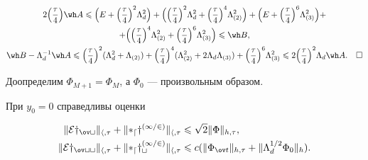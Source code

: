 \begin{gather*}


2\Big(\frac{\tau}{4}\Big)\wh A \lee \Big(E+\Big(\frac{\tau}{4}\Big)^2


\Lambda_d^2\Big)+\Big(\Big(\frac{\tau}{4}\Big)^2\Lambda_d^2+


\Big(\frac{\tau}{4}\Big)^4\Lambda_{(2)}^2\Big)+\Big(E+


\Big(\frac{\tau}{4}\Big)^6\Lambda_{(3)}^2\Big)+\\


%


+\Big(\Big(\frac{\tau}{4}\Big)^4\Lambda_{(2)}^2+


\Big(\frac{\tau}{4}\Big)^6\Lambda_{(3)}^2\Big)\lee\wh B ,\\


%


\wh B -\Lambda_d^{-1}\wh A \lee\Big(\frac{\tau}{4}\Big)^2


(\Lambda_d^2+\Lambda_{(2)})+\Big(\frac{\tau}{4}\Big)^4(\Lambda_{(2)}^2+


2\Lambda_d\Lambda_{(3)})+\Big(\frac{\tau}{4}\Big)^6\Lambda_{(3)}^2\lee


2\Big(\frac{\tau}{4}\Big)^2\Lambda_d\wh A.\quad\square


\end{gather*}





Доопределим $\Phi_{M+1}=\Phi_M$, а $\Phi_0$ --- произвольным образом.





\begin{lem} При $y_0=0$ справедливы оценки


\begin{align}


\|\cal E y_{\ov t}\|_{h,\tau}+\|\Lambda_dy^{(1/2)}\|_{h,\tau}&\lee


\sqrt 2\|\Phi\|_{h,\tau},\\


\|\cal E y_{\ov t t}\|_{h,\tau}+\|\Lambda_d y_t^{(1/2)}\|_{h,\tau}


&\lee c(\|\Phi_{\ov t}\|_{h,\tau}+\|\Lambda_d^{1/2}\Phi_0\|_h).


\end{align}


\end{lem}





